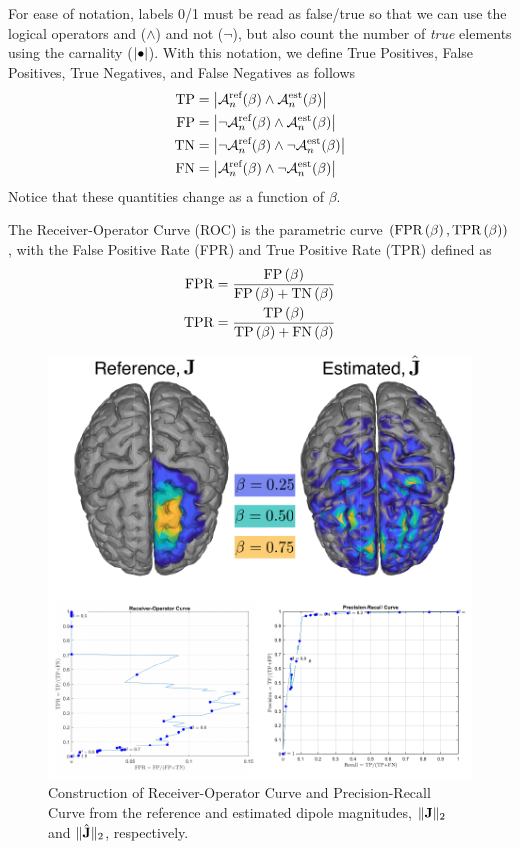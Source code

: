For ease of notation, labels 0/1 must be read as false/true so that we can use the logical operators and ($\wedge$) and not ($\neg$), but also count the number of \textit{true} elements using the carnality ($\left| {\bullet} \right|$).
%
With this notation, we define True Positives, False Positives, True Negatives, and False Negatives as follows
\begin{align}
\text{TP}
&=
\left| { 
\mathcal{A}_n^{\text{ref}}(\beta) \wedge 
\mathcal{A}_n^{\text{est}}(\beta) } \right|
\\
\text{FP}
&=
\left| { 
\neg \mathcal{A}_n^{\text{ref}}(\beta) \wedge 
\mathcal{A}_n^{\text{est}}(\beta) } \right|
\\
\text{TN}
&=
\left| { 
\neg \mathcal{A}_n^{\text{ref}}(\beta) \wedge 
\neg \mathcal{A}_n^{\text{est}}(\beta) } \right|
\\
\text{FN}
&=
\left| { 
\mathcal{A}_n^{\text{ref}}(\beta) \wedge 
\neg \mathcal{A}_n^{\text{est}}(\beta) } \right|
\end{align}
Notice that these quantities change as a function of $\beta$.

The Receiver-Operator Curve (ROC) is the parametric curve 
$\left( \text{FPR}\left( \beta \right), \text{TPR}\left( \beta \right) \right)$, with the False Positive Rate (FPR) and True Positive Rate (TPR) defined as
\begin{align}
\text{FPR}
&=
\frac{ \text{FP}\left( \beta \right) }{\text{FP}\left( \beta \right) + \text{TN}\left( \beta \right)}
\\
\text{TPR}
&=
\frac{ \text{TP}\left( \beta \right) }{\text{TP}\left( \beta \right) + \text{FN}\left( \beta \right)}
\end{align}

\begin{figure}
\centering
\includegraphics{./img_dev/AUROC_sketch.pdf}
%
\caption{Construction of Receiver-Operator Curve and Precision-Recall Curve from the reference and estimated dipole magnitudes, $\lVert {\mathbf{J}} \rVert_2$ and $\lVert \hat{\mathbf{J}} \rVert_2$, respectively.}
\end{figure}

